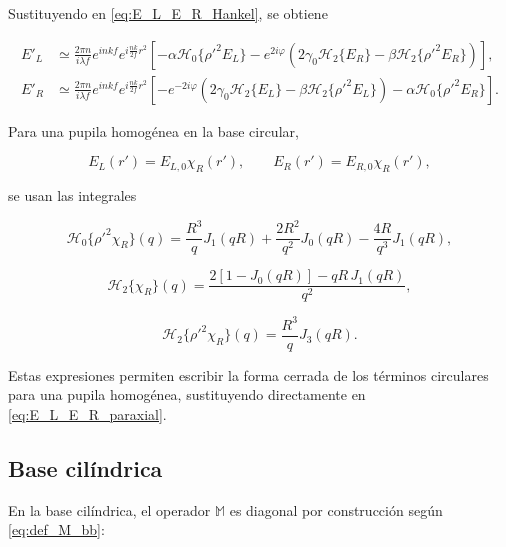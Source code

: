 Sustituyendo en \eqref{eq:E_L_E_R_Hankel}, se obtiene

\begin{equation}
\begin{aligned}
E'_L
&\simeq
\frac{2\pi n}{i\lambda f}
e^{inkf}
e^{i\frac{nk}{2f}r^2}
\left[
-\alpha\mathscr H_0\{\rho'^2E_L\}
-
e^{2i\varphi}
\left(
2\gamma_0\mathscr H_2\{E_R\}
-
\beta\mathscr H_2\{\rho'^2E_R\}
\right)
\right],
\\
E'_R
&\simeq
\frac{2\pi n}{i\lambda f}
e^{inkf}
e^{i\frac{nk}{2f}r^2}
\left[
-
e^{-2i\varphi}
\left(
2\gamma_0\mathscr H_2\{E_L\}
-
\beta\mathscr H_2\{\rho'^2E_L\}
\right)
-
\alpha\mathscr H_0\{\rho'^2E_R\}
\right].
\end{aligned}
\label{eq:E_L_E_R_paraxial}
\end{equation}

Para una pupila homogénea en la base circular,

\begin{equation}
E_L(r')=E_{L,0}\chi_R(r'),
\qquad
E_R(r')=E_{R,0}\chi_R(r'),
\end{equation}

se usan las integrales

\begin{equation}
\mathscr H_0\{\rho'^2\chi_R\}(q)
=
\frac{R^3}{q}J_1(qR)
+
\frac{2R^2}{q^2}J_0(qR)
-
\frac{4R}{q^3}J_1(qR),
\label{eq:H0_rho2_chiR}
\end{equation}

\begin{equation}
\mathscr H_2\{\chi_R\}(q)
=
\frac{
2[1-J_0(qR)]
-
qR\,J_1(qR)
}
{q^2},
\label{eq:H2_chiR}
\end{equation}

\begin{equation}
\mathscr H_2\{\rho'^2\chi_R\}(q)
=
\frac{R^3}{q}J_3(qR).
\label{eq:H2_rho2_chiR}
\end{equation}

Estas expresiones permiten escribir la forma cerrada de los términos circulares para una pupila homogénea, sustituyendo directamente en \eqref{eq:E_L_E_R_paraxial}.

\subsection{Base cilíndrica}

En la base cilíndrica, el operador $\mathbb{M}$ es diagonal por construcción según \eqref{eq:def_M_bb}:

